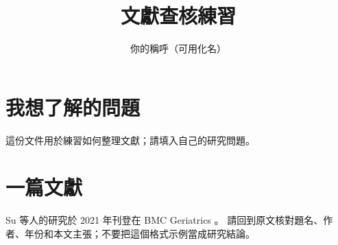 \documentclass[11pt,a4paper]{article}
\begin{document}
\title{文獻查核練習}
\author{你的稱呼（可用化名）}
\date{}
\maketitle
\section{我想了解的問題}
這份文件用於練習如何整理文獻；請填入自己的研究問題。
\section{一篇文獻}
Su 等人的研究於 2021 年刊登在 BMC Geriatrics \cite{Su2021}。
請回到原文核對題名、作者、年份和本文主張；不要把這個格式示例當成研究結論。


\end{document}
